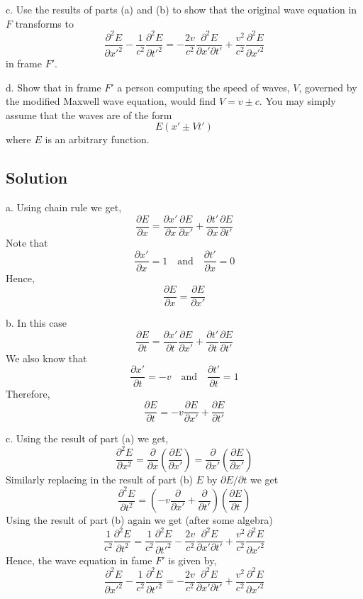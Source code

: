 \documentclass[solutions]{esg8022pset}
\begin{document}
\noindent
c. Use the results of parts (a) and (b) to show that the original wave equation in $F$ transforms to
$$\frac{\partial^2E}{\partial x'^2} - \frac{1}{c^2} \frac{\partial^2E}{\partial t'^2} = -\frac{2v}{c^2} \frac{\partial^2E}{\partial x' \partial t'} + \frac{v^2}{c^2} \frac{\partial^2E}{\partial x'^2}$$
in frame $F'$.


\noindent
d. Show that in frame $F'$ a person computing the speed of waves, $V$, governed by the modified Maxwell wave equation, would find $V = v \pm c$.  You may simply assume that the waves are of the form
$$E(x' \pm Vt')$$
where $E$ is an arbitrary function.

\subsection{Solution}

a. Using chain rule we get,
$$\frac{\partial E}{\partial x} = \frac{\partial x'}{\partial x}\frac{\partial E}{\partial x'} + \frac{\partial t'}{\partial x}\frac{\partial E}{\partial t'}$$
Note that
$$\frac{\partial x'}{\partial x} = 1 \quad \mbox{and} \quad  \frac{\partial t'}{\partial x} = 0$$
Hence,
$$\frac{\partial E}{\partial x} = \frac{\partial E}{\partial x'}$$


b. In this case
$$\frac{\partial E}{\partial t} = \frac{\partial x'}{\partial t}\frac{\partial E}{\partial x'} + \frac{\partial t'}{\partial t}\frac{\partial E}{\partial t'}$$
We also know that
$$\frac{\partial x'}{\partial t} = -v \quad \mbox{and} \quad  \frac{\partial t'}{\partial t} = 1$$
Therefore,
$$\frac{\partial E}{\partial t} = -v \frac{\partial E}{\partial x'} + \frac{\partial E}{\partial t'}$$

c. Using the result of part (a) we get,
$$\frac{\partial^2E}{\partial x^2}=\frac{\partial }{\partial x} ( \frac{\partial E}{\partial x'})= \frac{\partial }{\partial x'}(\frac{\partial E}{\partial x'}) $$
Similarly replacing in the result of part (b) $E$ by ${\partial E}/\partial t$ we get
$$\frac{\partial^{2} E}{\partial t^{2}} = (-v \frac{\partial }{\partial x'} + \frac{\partial }{\partial t'}) ( \frac{\partial E}{\partial t} )$$
Using the result of part (b) again we get (after some algebra)
$$ \frac{1}{c^2} \frac{\partial^2E}{\partial t^2}= \frac{1}{c^2} \frac{\partial^2E}{\partial t'^2}  -\frac{2v}{c^2} \frac{\partial^2E}{\partial x' \partial t'} + \frac{v^2}{c^2} \frac{\partial^2E}{\partial x'^2}$$
Hence, the wave equation in fame $F'$ is given by,
$$\frac{\partial^2E}{\partial x'^2} - \frac{1}{c^2} \frac{\partial^2E}{\partial t'^2} = -\frac{2v}{c^2} \frac{\partial^2E}{\partial x' \partial t'} + \frac{v^2}{c^2} \frac{\partial^2E}{\partial x'^2}$$
\end{document}
